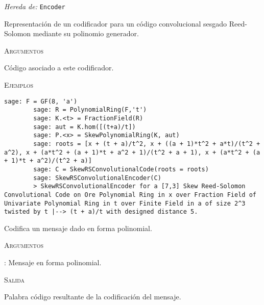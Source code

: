 \begin{description}[leftmargin=1em, font=\normalfont\ttfamily, style=nextline]
    \item[class SkewRSConvolutionalEncoder(self,code)]
    
    \emph{Hereda de: } \texttt{Encoder}

    Representación de un codificador para un código convolucional sesgado Reed-Solomon mediante su polinomio generador.

    \textsc{Argumentos}

    \begin{description}[leftmargin=1em, font=\normalfont\ttfamily]
    \item[code] Código asociado a este codificador.
    \end{description}

    \textsc{Ejemplos}

    \begin{lstlisting}[gobble=7]
        sage: F = GF(8, 'a')
        sage: R = PolynomialRing(F,'t')
        sage: K.<t> = FractionField(R)
        sage: aut = K.hom([(t+a)/t])
        sage: P.<x> = SkewPolynomialRing(K, aut)
        sage: roots = [x + (t + a)/t^2, x + ((a + 1)*t^2 + a*t)/(t^2 + a^2), x + (a*t^2 + (a + 1)*t + a^2 + 1)/(t^2 + a + 1), x + (a*t^2 + (a + 1)*t + a^2)/(t^2 + a)]
        sage: C = SkewRSConvolutionalCode(roots = roots) 
        sage: SkewRSConvolutionalEncoder(C)
        > SkewRSConvolutionalEncoder for a [7,3] Skew Reed-Solomon Convolutional Code on Ore Polynomial Ring in x over Fraction Field of Univariate Polynomial Ring in t over Finite Field in a of size 2^3 twisted by t |--> (t + a)/t with designed distance 5.
    \end{lstlisting}

    \begin{description}[font=\ttfamily,style=nextline]
        \item[encode(self,message\_poly)] 
        Codifica un mensaje dado en forma polinomial.

        \textsc{Argumentos}

        \begin{description}[font=\normalfont\ttfamily]
            \item[message\_poly]: Mensaje en forma polinomial. 
        \end{description}

        \textsc{Salida}

        \begin{description}[font=\normalfont\ttfamily]
            \item[] Palabra código resultante de la codificación del mensaje.
        \end{description}


\end{description}
\end{description}
